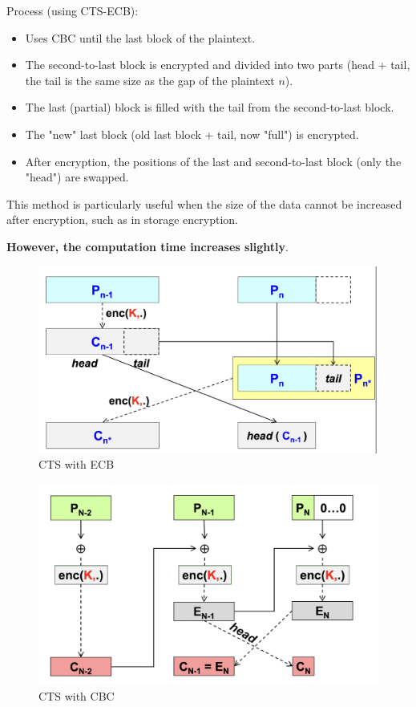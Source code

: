 Process (using CTS-ECB):
\begin{itemize}
    \item Uses CBC until the last block of the plaintext.
    \item The second-to-last block is encrypted and divided into two parts (head + tail, the tail is the same size as the gap of the plaintext $n$).
    \item The last (partial) block is filled with the tail from the second-to-last block.
    \item The "new" last block (old last block + tail, now "full") is encrypted.
    \item After encryption, the positions of the last and second-to-last block (only the "head") are swapped.
\end{itemize}
This method is particularly useful when the size of the data cannot be increased after encryption, such as in storage encryption.

\textbf{However, the computation time increases slightly}.

\begin{multicols}{2}

    \begin{figure}[H]
        \centering
        \includegraphics[width=\linewidth]{Images/Cryptography/CTS_ECB.png}
        \caption{CTS with ECB}
    \end{figure}

    \columnbreak

    \begin{figure}[H]
        \centering
        \includegraphics[width=\linewidth]{Images/Cryptography/CTS_CBC.png}
        \caption{CTS with CBC}
    \end{figure}
    
\end{multicols}

